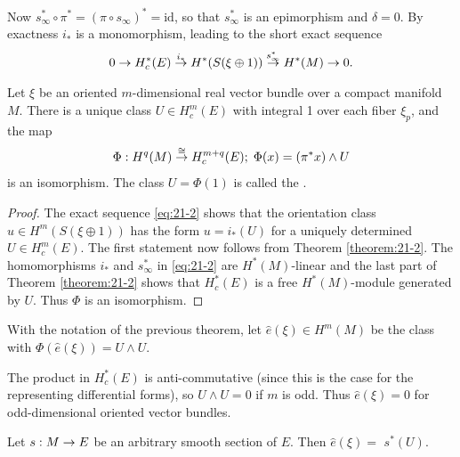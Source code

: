 Now ${s}_{\infty }^* \circ  {\pi }^* = {( \pi  \circ  {s}_{\infty }) }^* = \mathrm{{id}}$, so that ${s}_{\infty }^*$ 
is an epimorphism and $\delta  = 0$. By exactness ${i}_{ * }$ is a monomorphism, leading to the short exact sequence
\begin{align}\label{eq:21-2}
  0 \rightarrow  H_c^*( E) \overset{{i}_{ * }}
  { \rightarrow  } H^*( {S( {\xi  \oplus  1}) }) 
  \overset{{s}_{\infty }^*}
  { \rightarrow  } H^*(M) \rightarrow  0.
\end{align}


\begin{theorem}\label{theorem:21-3}
  Let $\xi$ be an oriented $m$-dimensional real vector bundle over a compact manifold $M$. There 
  is a unique class $U \in  H_c^{m}( E)$ with integral 1 over each fiber ${\xi }_{p}$, and the map
  \[
    \Phi  : {H}^{q}( M) \overset{ \cong  }{ \rightarrow  }H_c^{m + q}( E) ;\;\Phi ( x)  = ( {{\pi }^*x})  \land  U
  \]
  is an isomorphism. The class $U = \Phi ( 1)$ is called the .
\end{theorem}

\begin{proof}
  The exact sequence \eqref{eq:21-2} shows that the orientation class $u \in  H^m( {S( {\xi  \oplus  1}) })$ 
  has the form $u = {i}_{ * }( U)$ for a uniquely determined $U \in  H_c^{m}( E)$. The first statement now follows 
  from Theorem \ref{theorem:21-2}. The homomorphisms ${i}_{ * }$ and ${s}_{\infty }^*$ in \eqref{eq:21-2} 
  are ${H}^*( M)$-linear and the last part of Theorem \ref{theorem:21-2} shows that $H_c^*( E)$ is a free ${H}^*( M)$-module 
  generated by $U$. Thus $\Phi$ is an isomorphism.
\end{proof}

\begin{definition}\label{definition:21-4}
  With the notation of the previous theorem, let $\hat{e}( \xi )  \in  H^m( M)$ be the class 
  with $\Phi({\hat{e}( \xi ) }) = U \land  U$.
\end{definition}


The product in $H_c^*( E)$ is anti-commutative (since this is the case for the representing differential forms), 
so $U \land  U = 0$ if $m$ is odd. Thus $\hat{e}( \xi )  = 0$ for odd-dimensional oriented vector bundles.

\begin{lemma}\label{lemma:21-5}
  Let $s : M \rightarrow  E$ be an arbitrary smooth section of $E$. Then $\hat{e}( \xi )  =$  ${s}^*( U)$.
\end{lemma}

